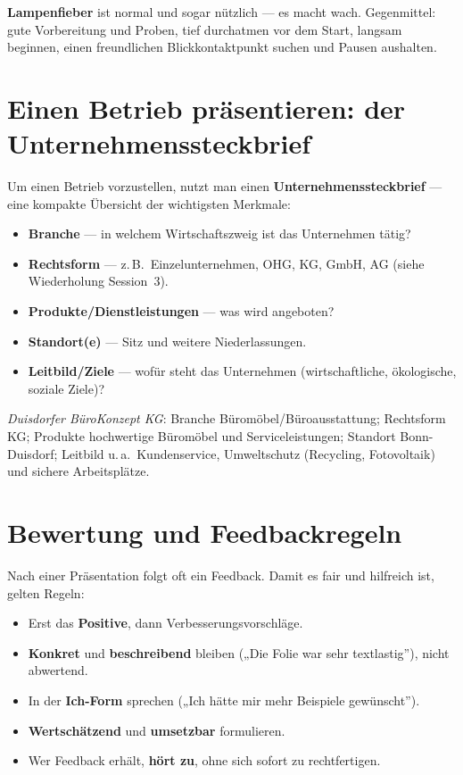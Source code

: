 \documentclass[11pt, a4paper]{article}
\begin{document}
\begin{merksatz}
\textbf{Lampenfieber} ist normal und sogar nützlich --- es macht wach. Gegenmittel: gute
Vorbereitung und Proben, tief durchatmen vor dem Start, langsam beginnen, einen freundlichen
Blickkontaktpunkt suchen und Pausen aushalten.
\end{merksatz}

\section{Einen Betrieb präsentieren: der Unternehmenssteckbrief}

Um einen Betrieb vorzustellen, nutzt man einen \textbf{Unternehmenssteckbrief} --- eine
kompakte Übersicht der wichtigsten Merkmale:

\begin{itemize}
  \item \textbf{Branche} --- in welchem Wirtschaftszweig ist das Unternehmen tätig?
  \item \textbf{Rechtsform} --- z.\,B.\ Einzelunternehmen, OHG, KG, GmbH, AG (siehe Wiederholung Session~3).
  \item \textbf{Produkte/Dienstleistungen} --- was wird angeboten?
  \item \textbf{Standort(e)} --- Sitz und weitere Niederlassungen.
  \item \textbf{Leitbild/Ziele} --- wofür steht das Unternehmen (wirtschaftliche, ökologische, soziale Ziele)?
\end{itemize}

\begin{beispiel}
\emph{Duisdorfer BüroKonzept KG}: Branche Büromöbel/Büroausstattung; Rechtsform KG;
Produkte hochwertige Büromöbel und Serviceleistungen; Standort Bonn-Duisdorf; Leitbild
u.\,a.\ Kundenservice, Umweltschutz (Recycling, Fotovoltaik) und sichere Arbeitsplätze.
\end{beispiel}

\section{Bewertung und Feedbackregeln}

Nach einer Präsentation folgt oft ein Feedback. Damit es fair und hilfreich ist, gelten
Regeln:

\begin{itemize}
  \item Erst das \textbf{Positive}, dann Verbesserungsvorschläge.
  \item \textbf{Konkret} und \textbf{beschreibend} bleiben („Die Folie war sehr textlastig”), nicht abwertend.
  \item In der \textbf{Ich-Form} sprechen („Ich hätte mir mehr Beispiele gewünscht”).
  \item \textbf{Wertschätzend} und \textbf{umsetzbar} formulieren.
  \item Wer Feedback erhält, \textbf{hört zu}, ohne sich sofort zu rechtfertigen.
\end{itemize}
\end{document}
